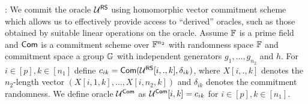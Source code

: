 : We commit the oracle $\mathcal{U}^{\mathsf{RS}}$ using
homomorphic vector commitment scheme which allows us to effectively provide
access to ``derived'' oracles, such as those obtained by suitable linear
operations on the oracle. Assume $\mathbb{F}$ is a prime field and $\mathsf{Com}$ is a
commitment scheme over $\mathbb{F}^{n_2}$ with randomness space $\mathbb{F}$ and commitment
space a group $\mathbb{G}$ with independent generators $g_1,\ldots,g_{n_2}$ and $h$.
For $i\in [p], k\in [n_1]$ define $c_{ik}=\mathsf{Com}(\mathcal{U}^{\mathsf{RS}}[i,.,k],\delta_{ik})$,
where $X[i,.,k]$ denotes the $n_2$-length vector $(X[i,1,k],\ldots,X[i,n_2,k])$
and $\delta_{ik}$ denotes the commitment randomness. We define oracle
$\mathcal{U}^{\mathsf{Com}}$ as $\mathcal{U}^{\mathsf{Com}}[i,k]=c_{ik}$ for $i\in [p],k\in [n_1]$.

